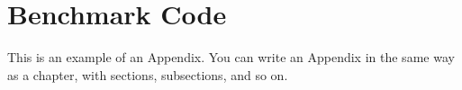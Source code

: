
\chapter{Benchmark Code}
This is an example of an Appendix. You can write an Appendix in the same way as a chapter, with sections, subsections, and so on.

